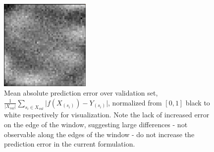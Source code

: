 \begin{figure}
	\begin{center}
		\includegraphics[width=0.39\textwidth]{images/mean_error_turbulence.png}
		\caption{\small Mean absolute prediction error over validation set,  $ \frac{1}{\left\vert X_{val} \right\vert} \sum_{s_i \in X_{val}}^{} \vert f(X_{(s_i)}) -  Y_{(s_i)} \vert $, normalized from $[0, 1]$ black to white respectively for visualization. Note the lack of increased error on the edge of the window, suggesting large differences - not observable along the edges of the window - do not increase the prediction error in the current formulation.}
		\label{mean_error}
	\end{center}	
\end{figure}

